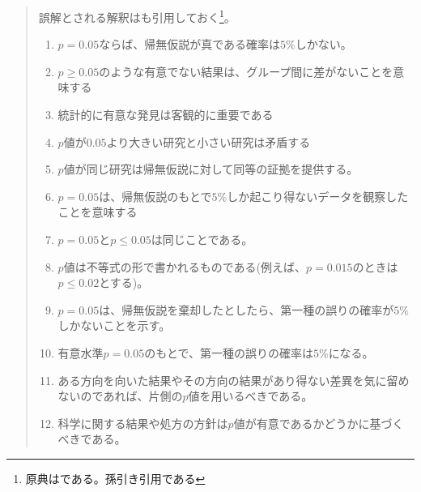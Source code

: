 \begin{mybox}
\begin{quote}
    誤解とされる解釈はも引用しておく\cite{idiot_statistics2014}\footnote{原典は\cite{GOODMAN2008135}である。孫引き引用である}。
    \begin{enumerate}
        \item $p=0.05$ならば、帰無仮説が真である確率は$5\%$しかない。
        \item $p\geq 0.05$のような有意でない結果は、グループ間に差がないことを意味する
        \item 統計的に有意な発見は客観的に重要である
        \item $p$値が$0.05$より大きい研究と小さい研究は矛盾する
        \item $p$値が同じ研究は帰無仮説に対して同等の証拠を提供する。
        \item $p=0.05$は、帰無仮説のもとで$5\%$しか起こり得ないデータを観察したことを意味する
        \item $p=0.05$と$p\leq 0.05$は同じことである。
        \item $p$値は不等式の形で書かれるものである(例えば、$p=0.015$のときは$p\leq 0.02$とする)。
        \item $p=0.05$は、帰無仮説を棄却したとしたら、第一種の誤りの確率が$5\%$しかないことを示す。
        \item 有意水準$p=0.05$のもとで、第一種の誤りの確率は$5\%$になる。
        \item ある方向を向いた結果やその方向の結果があり得ない差異を気に留めないのであれば、片側の$p$値を用いるべきである。
        \item 科学に関する結果や処方の方針は$p$値が有意であるかどうかに基づくべきである。
    \end{enumerate}

    \end{quote}
\end{mybox}

